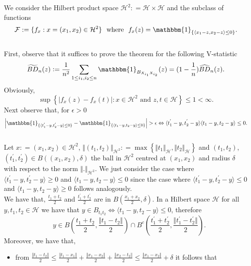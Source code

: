 \documentclass[a4paper]{article}
\def\defeq{\mathrel{\mathop:}=}
\numberwithin{equation}{section}
\def\defeq{\mathrel{\mathop:}=}
\newcommand{\I}{\mathbbm{1}}
\begin{document}
\begin{enumerate}[label=(\Alph*)]
We consider  the Hilbert product space $\mathcal{H}^2 \defeq \mathcal{H \times H}$ and the subclass of functions
$$\mathcal{F}:= \{f_x: x=(x_1,x_2) \in \mathcal{H}^2\} \ \ \mbox{where} \ \ f_x(z) = \I_{ \{ \langle x_1-z, x_2-z \rangle \leq 0 \} }.$$
\\
First, observe that it suffices to prove the theorem for the following V-statistic
\\
 $$\widetilde{BD}_n(z) \defeq \frac{1}{n^2}  \sum_{1 \leq i_1,i_2 \leq n} \I_{B_{ X_{i_1} X_{i_2}}}(z)=  (1 - \frac{1}{n}) \widehat{BD}_n(z).$$  
Obviously,
$$\sup \left \{  \left \vert f_x(z)-f_x(t)  \right \vert : x \in \mathcal{H}^2 \,\, \textrm{and} \,\, z,t  \in \mathcal{H} \right \} \leq 1 < \infty.$$
Next observe  that, for $\epsilon>0$ $$ \left \vert \I_{ \{ \langle t^{'}_1-y, t^{'}_2-y \rangle \leq 0\} }  - \I_{ \{ \langle t_1-y, t_2-y \rangle \leq 0 \} } \right \vert > \epsilon  \Leftrightarrow   \langle t^{'}_1-y, t^{'}_2-y \rangle  \langle t_1-y, t_2-y \rangle \leq 0.$$ 
\\
Let $x \defeq (x_1,x_2) \in \mathcal{H}^2$, $\Vert (t_1, t_2) \Vert_{\mathcal{H}^2} \defeq  \max \left \{    \Vert t_1 \Vert_{\mathcal{H}} ,  \Vert t_2 \Vert_{\mathcal{H}}    \right \}$ and $(t_1,t_2)$, $(t^{'}_1,t^{'}_2)  \in B \left( (x_1,x_2), \delta \right)$  the ball in $\mathcal{H}^2$ centred at $(x_1,x_2)$ and radius $\delta$ with respect to the norm $  \Vert . \Vert_{\mathcal{H}^2}$.  We just consider the case where  $\langle t^{'}_1-y, t^{'}_2-y \rangle \geq 0$ and $\langle t_1-y, t_2-y \rangle \leq 0$ since the case where
  $\langle t^{'}_1-y, t^{'}_2-y \rangle \leq 0$ and $\langle t_1-y, t_2-y \rangle \geq 0$ follows analogously.
 \\
We have that,  $\frac{t_1 + t_2}{2}$ and  $\frac{t^{'}_1+t^{'}_2}{2}$ are in $B \left (\frac{x_1+x_2}{2}, \delta \right)$. In a Hilbert  space   $\mathcal{H}$ for all $y,t_1,t_2 \in \mathcal{H}$  we have that $y \in B_{ t_1 t_2} \Leftrightarrow  \langle t_1 - y, t_2 - y \rangle \leq 0$,  therefore 
 $$\quad y \in B \left(\frac{t_1+t_2}{2}, \frac{ \Vert t_1- t_2 \Vert}{2}\right) \cap  B^c\left(\frac{t^{'}_1+t^{'}_2}{2}, \frac{ \Vert t^{'}_1- t^{'}_2 \Vert}{2}\right).$$ Moreover, we have that,
\\
\begin{itemize}
\item from $\frac{\Vert t_1 -t_2\Vert}{2} \leq  \frac{\Vert t_1 -x_1\Vert}{2} +\frac{\Vert x_1 -x_2\Vert}{2} +\frac{\Vert x_2 -t_2\Vert}{2} \leq                      \frac{\Vert x_1-x_2\Vert}{2} +\delta$ it follows that

\end{itemize}
\end{enumerate}
\end{document}
